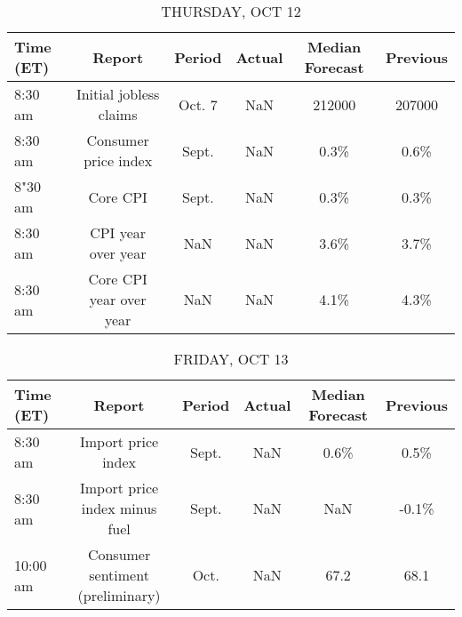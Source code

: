 \documentclass{article}%
\begin{document}
%


\begin{table}[htbp]%
\caption{THURSDAY, OCT 12}%
\centering%
\begin{adjustbox}{width=1\textwidth}%
\begin{tabular}{lccccc}
\toprule
Time (ET) &                  Report & Period & Actual & Median Forecast & Previous \\
\midrule
  8:30 am &  Initial jobless claims & Oct. 7 &    NaN &          212000 &   207000 \\
  8:30 am &    Consumer price index &  Sept. &    NaN &            0.3\% &     0.6\% \\
  8"30 am &                Core CPI &  Sept. &    NaN &            0.3\% &     0.3\% \\
  8:30 am &      CPI year over year &    NaN &    NaN &            3.6\% &     3.7\% \\
  8:30 am & Core CPI year over year &    NaN &    NaN &            4.1\% &     4.3\% \\
\bottomrule
\end{tabular}
%
\end{adjustbox}%
\end{table}

%


\begin{table}[htbp]%
\caption{FRIDAY, OCT 13}%
\centering%
\begin{adjustbox}{width=1\textwidth}%
\begin{tabular}{lccccc}
\toprule
Time (ET) &                           Report & Period & Actual & Median Forecast & Previous \\
\midrule
  8:30 am &               Import price index &  Sept. &    NaN &            0.6\% &     0.5\% \\
  8:30 am &    Import price index minus fuel &  Sept. &    NaN &             NaN &    -0.1\% \\
 10:00 am & Consumer sentiment (preliminary) &   Oct. &    NaN &            67.2 &     68.1 \\
\bottomrule
\end{tabular}
%
\end{adjustbox}%
\end{table}
\end{document}
